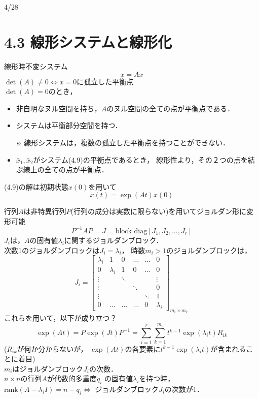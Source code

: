 \documentclass{jsarticle}
\begin{document}
4/28

\section*{4.3 線形システムと線形化}
線形時不変システム
\begin{equation*}
  \dot x = Ax \tag{4.9}
\end{equation*}
$\det (A) \neq 0\Leftrightarrow x=0$に孤立した平衡点\\
$\det (A) = 0$のとき，
\begin{itemize}
  \item 非自明なヌル空間を持ち，$A$のヌル空間の全ての点が平衡点である．
  \item システムは平衡部分空間を持つ．
  \item[※] 線形システムは，複数の孤立した平衡点を持つことができない．
  \item $\bar x_1,\bar x_2$がシステム(4.9)の平衡点であるとき，
  線形性より，その２つの点を結ぶ線上の全ての点が平衡点．
\end{itemize}


(4.9)の解は初期状態$x(0)$を用いて
\begin{equation*}
  x(t) = \exp(At)x(0) \tag{4.10}
\end{equation*}

行列$A$は非特異行列$P$(行列の成分は実数に限らない)を用いてジョルダン形に変形可能
\begin{equation*}
  P^{-1}AP=J = \text{block diag}[J_1,J_2,\dots ,J_r]
\end{equation*}
$J_i$は，$A$の固有値$\lambda_i$に関するジョルダンブロック．\\
次数1のジョルダンブロックは$J_i = \lambda_i$，
時数$m_i>1$のジョルダンブロックは，
\begin{equation*}
  J_i = \left[
    \begin{matrix}
      \lambda_i & 1 & 0 & \dots & \dots & 0\\
      0 & \lambda_i & 1 & 0 & \dots & 0\\
      \vdots && \ddots &&&\vdots \\
      \vdots &&&\ddots && 0\\
      \vdots &&&& \ddots & 1 \\
      0 & \dots &\dots & \dots & 0 & \lambda_i 
    \end{matrix}
  \right]_{m_i\times m_i.}
\end{equation*}
これらを用いて，以下が成り立つ？
\begin{equation*}
  \exp(At) = P \exp(Jt) P^{-1} = 
  \sum^r_{i=1}\sum^{m_i}_{k=1} t^{k-1} \exp(\lambda_i t)R_{ik} \tag{4.11}
\end{equation*}
($R_{ik}$が何か分からないが，
$\exp(At)$の各要素に$t^{k-1} \exp(\lambda_i t)$が含まれることに着目)\\
$m_i$はジョルダンブロック$J_i$の次数．\\
$n\times n$の行列$A$が代数的多重度$q_i$
の固有値$\lambda_i$を持つ時，
$\text{rank}(A-\lambda_i I) = n-q_i\Leftrightarrow$
ジョルダンブロック$J_i$の次数が1．
\end{document}
